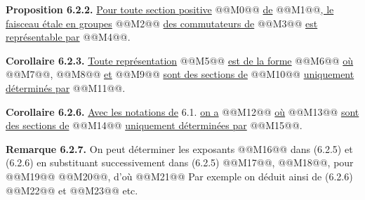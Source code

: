 
\textbf{Proposition 6.2.2.} \uline{Pour toute section positive} @@M0@@ \uline{de} @@M1@@\uline{, le faisceau étale en groupes} @@M2@@ \uline{des commutateurs de} @@M3@@ \uline{est représentable par}
@@M4@@.

\textbf{Corollaire 6.2.3.} \uline{Toute représentation}
@@M5@@
\uline{est de la forme}
@@M6@@
\uline{où} @@M7@@, @@M8@@ \uline{et} @@M9@@ \uline{sont des sections de} @@M10@@ \uline{uniquement déterminés par} @@M11@@.

\textbf{Corollaire 6.2.6.} \uline{Avec les notations de} 6.1. \uline{on a}
@@M12@@
\uline{où} @@M13@@ \uline{sont des sections de} @@M14@@ \uline{uniquement déterminées par} @@M15@@.

\textbf{Remarque 6.2.7.} On peut déterminer les exposants @@M16@@ dans (6.2.5) et (6.2.6) en substituant successivement dans (6.2.5)
@@M17@@, @@M18@@, pour @@M19@@ @@M20@@, d'où
@@M21@@
Par exemple on déduit ainsi de (6.2.6)
@@M22@@
et
@@M23@@
etc.

